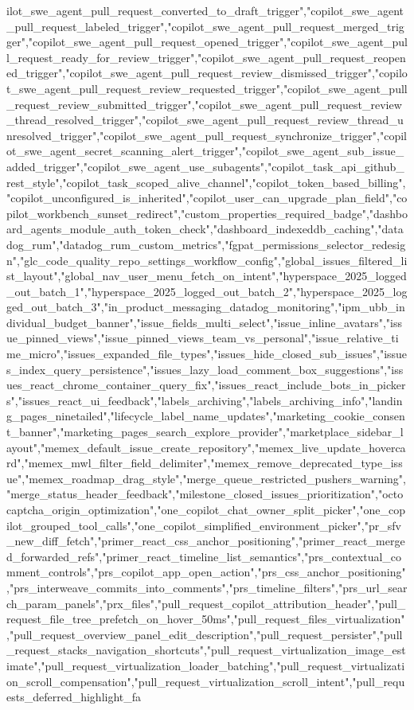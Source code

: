 {{{{{{{{{{ilot_swe_agent_pull_request_converted_to_draft_trigger","copilot_swe_agent_pull_request_labeled_trigger","copilot_swe_agent_pull_request_merged_trigger","copilot_swe_agent_pull_request_opened_trigger","copilot_swe_agent_pull_request_ready_for_review_trigger","copilot_swe_agent_pull_request_reopened_trigger","copilot_swe_agent_pull_request_review_dismissed_trigger","copilot_swe_agent_pull_request_review_requested_trigger","copilot_swe_agent_pull_request_review_submitted_trigger","copilot_swe_agent_pull_request_review_thread_resolved_trigger","copilot_swe_agent_pull_request_review_thread_unresolved_trigger","copilot_swe_agent_pull_request_synchronize_trigger","copilot_swe_agent_secret_scanning_alert_trigger","copilot_swe_agent_sub_issue_added_trigger","copilot_swe_agent_use_subagents","copilot_task_api_github_rest_style","copilot_task_scoped_alive_channel","copilot_token_based_billing","copilot_unconfigured_is_inherited","copilot_user_can_upgrade_plan_field","copilot_workbench_sunset_redirect","custom_properties_required_badge","dashboard_agents_module_auth_token_check","dashboard_indexeddb_caching","datadog_rum","datadog_rum_custom_metrics","fgpat_permissions_selector_redesign","glc_code_quality_repo_settings_workflow_config","global_issues_filtered_list_layout","global_nav_user_menu_fetch_on_intent","hyperspace_2025_logged_out_batch_1","hyperspace_2025_logged_out_batch_2","hyperspace_2025_logged_out_batch_3","in_product_messaging_datadog_monitoring","ipm_ubb_individual_budget_banner","issue_fields_multi_select","issue_inline_avatars","issue_pinned_views","issue_pinned_views_team_vs_personal","issue_relative_time_micro","issues_expanded_file_types","issues_hide_closed_sub_issues","issues_index_query_persistence","issues_lazy_load_comment_box_suggestions","issues_react_chrome_container_query_fix","issues_react_include_bots_in_pickers","issues_react_ui_feedback","labels_archiving","labels_archiving_info","landing_pages_ninetailed","lifecycle_label_name_updates","marketing_cookie_consent_banner","marketing_pages_search_explore_provider","marketplace_sidebar_layout","memex_default_issue_create_repository","memex_live_update_hovercard","memex_mwl_filter_field_delimiter","memex_remove_deprecated_type_issue","memex_roadmap_drag_style","merge_queue_restricted_pushers_warning","merge_status_header_feedback","milestone_closed_issues_prioritization","octocaptcha_origin_optimization","one_copilot_chat_owner_split_picker","one_copilot_grouped_tool_calls","one_copilot_simplified_environment_picker","pr_sfv_new_diff_fetch","primer_react_css_anchor_positioning","primer_react_merged_forwarded_refs","primer_react_timeline_list_semantics","prs_contextual_comment_controls","prs_copilot_app_open_action","prs_css_anchor_positioning","prs_interweave_commits_into_comments","prs_timeline_filters","prs_url_search_param_panels","prx_files","pull_request_copilot_attribution_header","pull_request_file_tree_prefetch_on_hover_50ms","pull_request_files_virtualization","pull_request_overview_panel_edit_description","pull_request_persister","pull_request_stacks_navigation_shortcuts","pull_request_virtualization_image_estimate","pull_request_virtualization_loader_batching","pull_request_virtualization_scroll_compensation","pull_request_virtualization_scroll_intent","pull_requests_deferred_highlight_fa}}}}}}}}}}
